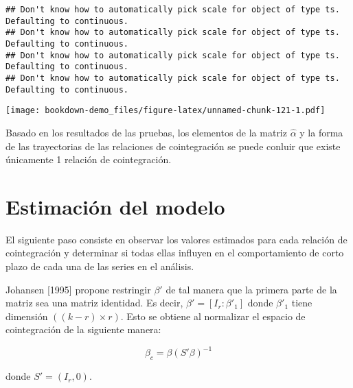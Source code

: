 \documentclass[]{book}
\newenvironment{Shaded}{\begin{snugshade}}{\end{snugshade}}
\newcommand{\KeywordTok}[1]{\textcolor[rgb]{0.13,0.29,0.53}{\textbf{#1}}}
\newcommand{\DataTypeTok}[1]{\textcolor[rgb]{0.13,0.29,0.53}{#1}}
\newcommand{\DecValTok}[1]{\textcolor[rgb]{0.00,0.00,0.81}{#1}}
\newcommand{\StringTok}[1]{\textcolor[rgb]{0.31,0.60,0.02}{#1}}
\newcommand{\CommentTok}[1]{\textcolor[rgb]{0.56,0.35,0.01}{\textit{#1}}}
\newcommand{\OperatorTok}[1]{\textcolor[rgb]{0.81,0.36,0.00}{\textbf{#1}}}
\newcommand{\NormalTok}[1]{#1}
\theoremstyle{definition}
\theoremstyle{definition}
\theoremstyle{definition}
\theoremstyle{remark}
\begin{document}
\begin{verbatim}
## Don't know how to automatically pick scale for object of type ts. Defaulting to continuous.
## Don't know how to automatically pick scale for object of type ts. Defaulting to continuous.
## Don't know how to automatically pick scale for object of type ts. Defaulting to continuous.
## Don't know how to automatically pick scale for object of type ts. Defaulting to continuous.
\end{verbatim}

\texttt{[image: bookdown-demo\_files/figure-latex/unnamed-chunk-121-1.pdf]}

Basado en los resultados de las pruebas, los elementos de la matriz
\(\hat{\alpha}\) y la forma de las trayectorias de las relaciones de
cointegración se puede conluir que existe únicamente 1 relación de
cointegración.

\chapter{Estimación del modelo}\label{estimacion-del-modelo}

El siguiente paso consiste en observar los valores estimados para cada
relación de cointegración y determinar si todas ellas influyen en el
comportamiento de corto plazo de cada una de las series en el análisis.

Johansen {[}1995{]} propone restringir \(\beta'\) de tal manera que la
primera parte de la matriz sea una matriz identidad. Es decir,
\(\beta'=[I_r : \beta'_1]\) donde \(\beta'_1\) tiene dimensión
\(((k-r) \times r)\). Esto se obtiene al normalizar el espacio de
cointegración de la siguiente manera:

\[\beta_c = \beta (S'\beta)^{-1}\]

donde \(S'= (I_r,0)\).

\begin{Shaded}
\end{Shaded}
\end{document}
